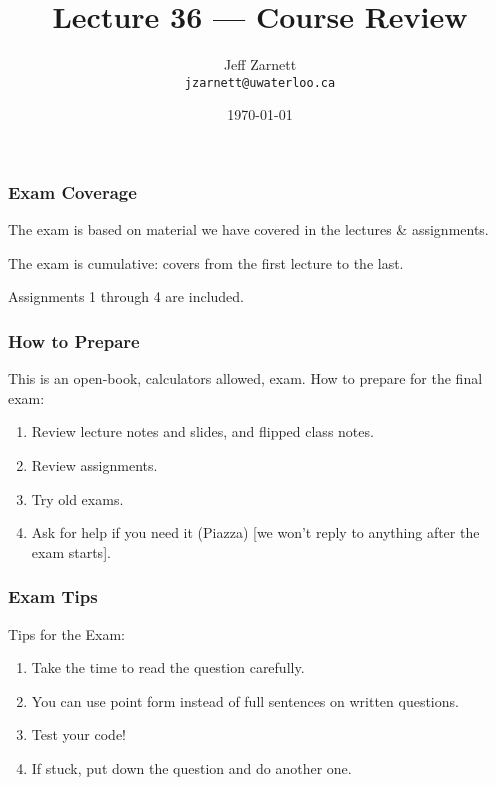 

\title{Lecture 36 --- Course Review }

\author{Jeff Zarnett \\ \small \texttt{jzarnett@uwaterloo.ca}}
\date{\today}




\begin{frame}
  \titlepage

\end{frame}

\begin{frame}
\frametitle{Exam Coverage}

The exam is based on material we have covered in the lectures \& assignments.

The exam is cumulative: covers from the first lecture to the last.

Assignments 1 through 4 are included.

\end{frame}

\begin{frame}
\frametitle{How to Prepare}

This is an open-book, calculators allowed, exam.
How to prepare for the final exam:

\begin{enumerate}
	\item Review lecture notes and slides, and flipped class notes.
	\item Review assignments.
	\item Try old exams.
	\item Ask for help if you need it (Piazza) [we won't reply to anything after the exam starts].
\end{enumerate}

\end{frame}

\begin{frame}
\frametitle{Exam Tips}

Tips for the Exam:

\begin{enumerate}
	\item Take the time to read the question carefully.
	\item You can use point form instead of full sentences on written questions.
	\item Test your code!
	\item If stuck, put down the question and do another one.
\end{enumerate}

\end{frame}


